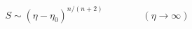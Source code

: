 \begin{equation} S \sim (\eta-
	    \eta_0)^{n/(n+2)} \qquad \qquad (\eta \rightarrow \infty)
	    \end{equation} 
